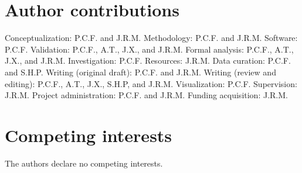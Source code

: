 \documentclass[10pt]{article}
\begin{document}
\section*{Author contributions}

Conceptualization: P.C.F. and J.R.M. Methodology: P.C.F. and J.R.M. Software:
P.C.F. Validation: P.C.F., A.T., J.X., and J.R.M. Formal analysis: P.C.F., A.T.,
J.X., and J.R.M. Investigation: P.C.F. Resources: J.R.M. Data curation: P.C.F. and S.H.P.
Writing (original draft): P.C.F. and J.R.M. Writing (review and editing):
P.C.F., A.T., J.X., S.H.P, and J.R.M. Visualization: P.C.F. Supervision: J.R.M. Project
administration: P.C.F. and J.R.M. Funding acquisition: J.R.M.


\section*{Competing interests}

The authors declare no competing interests.
\end{document}
